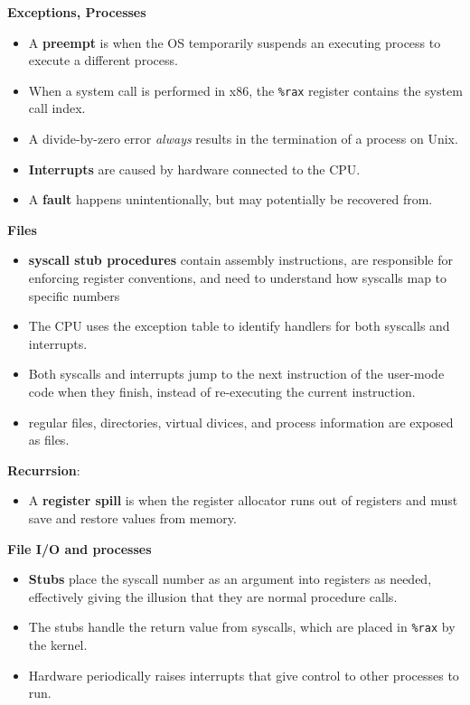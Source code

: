 \documentclass[titlepage, 12pt, leqno]{article}
\begin{document}
\begin{multicols*}{2}
\textbf{Exceptions, Processes}
\begin{itemize}
    \item A \textbf{preempt} is when the OS temporarily suspends an executing
        process to execute a different process.
    \item When a system call is performed in x86, the \texttt{\%rax} register
        contains the system call index.
    \item A divide-by-zero error \textit{always} results in the termination of a
        process on Unix.
    \item \textbf{Interrupts} are caused by hardware connected to the CPU.
    \item A \textbf{fault} happens unintentionally, but may potentially be 
        recovered from.
\end{itemize}

\columnbreak
\textbf{Files}
\begin{itemize}
    \item \textbf{syscall stub procedures} contain assembly instructions, are
        responsible for enforcing register conventions, and need to understand
        how syscalls map to specific numbers
    \item The CPU uses the exception table to identify handlers for both syscalls
        and interrupts.
    \item Both syscalls and interrupts jump to the next instruction of the
        user-mode code when they finish, instead of re-executing the current
        instruction.
    \item regular files, directories, virtual divices, and process information
        are exposed as files.
\end{itemize}

\textbf{Recurrsion}:
\begin{itemize}
    \item A \textbf{register spill} is when the register allocator runs out of
        registers and must save and restore values from memory.
\end{itemize}

\textbf{File I/O and processes}
\begin{itemize}
    \item \textbf{Stubs} place the syscall number as an argument into registers
        as needed, effectively giving the illusion that they are normal procedure
        calls.
    \item The stubs handle the return value from syscalls, which are placed in
        \texttt{\%rax} by the kernel.
    \item Hardware periodically raises interrupts that give control to other
        processes to run.
\end{itemize}


\end{multicols*}
\end{document}
